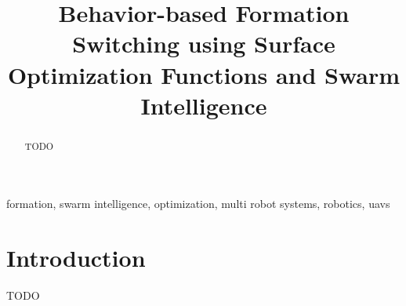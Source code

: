 \documentclass[conference]{IEEEtran}
\begin{document}
\title{Behavior-based Formation Switching using Surface Optimization Functions and Swarm Intelligence}

\author{
\and
{}
}

\maketitle

\begin{abstract}
TODO
\end{abstract}

\begin{IEEEkeywords}
formation, swarm intelligence, optimization, multi robot systems, robotics, uavs 
\end{IEEEkeywords}

\section{Introduction}
TODO



\end{document}
